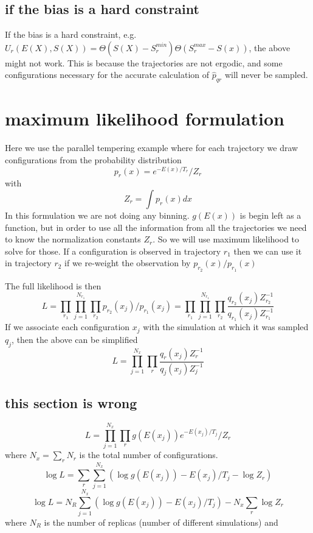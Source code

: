 \documentclass[a4paper]{article}
\begin{document}
\subsection{if the bias is a hard constraint}

If the bias is a hard constraint, e.g. $U_r(E(X), S(X)) = \Theta(S(X)-S_{r}^{min}) \Theta(S_{r}^{max}-S(x))$, the above might not work.
This is because the trajectories are not ergodic, and some configurations necessary for the accurate calculation of $\hat{p}_{qr}$
will never be sampled.

\section{maximum likelihood formulation}

Here we use the parallel tempering example where for each trajectory we draw configurations
from the probability distribution
\begin{equation}
p_r(x) = e^{- E(x) / T_r} / Z_{r}
\end{equation}
with 
\begin{equation}
Z_r = \int p_r(x) dx
\end{equation}
In this formulation we are not doing any binning.  $g(E(x))$ is begin left as a function, but in
order to use all the information from all the trajectories we need to know the normalization constants
$Z_r$.  So we will use maximum likelihood to solve for those.
If a configuration is observed in trajectory $r_1$ then we can use it in trajectory $r_2$ if we re-weight 
the observation by $p_{r_2}(x) / p_{r_1}(x)$

The full likelihood is then
\begin{equation}
L = \prod_{r_1} \prod_{j=1}^{N_{r_1}} \prod_{r_2} p_{r_2} (x_j) / p_{r_1} (x_j) 
= \prod_{r_1} \prod_{j=1}^{N_{r_1}} \prod_{r_2} \frac{q_{r_2}(x_j) Z_{r_2}^{-1}}{q_{r_1}(x_j) Z_{r_1}^{-1}} 
\end{equation}
If we associate each configuration $x_j$ with the simulation at which it was sampled $q_j$, then the above can
be simplified
\begin{equation}
L = \prod_{j=1}^{N_{x}} \prod_{r} \frac{q_{r}(x_j) Z_{r}^{-1}}{q_{j}(x_j) Z_{j}^{-1}} 
\end{equation}

\subsection{this section is wrong}

\begin{equation}
L = \prod_{j=1}^{N_x} \prod_{r} g(E(x_j)) e^{-E(x_j) / T_{j} } / Z_{r}
\end{equation}
where $N_{x} = \sum_r N_r$ is the total number of configurations. 
\begin{equation}
\log L =
\sum_{r} \sum_{j=1}^{N_{x}} ( \log g(E(x_j)) -E(x_j) / T_{j} - \log Z_{r} )
\end{equation}
\begin{equation}
\log L =
N_R \sum_{j=1}^{N_{x}} ( \log g(E(x_j)) -E(x_j) / T_{j})
- N_{x} \sum_{r} \log Z_{r}
\end{equation}
where $N_R$ is the number of replicas (number of different simulations) and 
\end{document}
